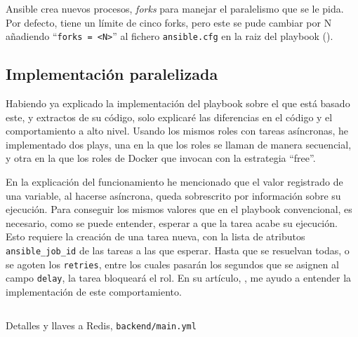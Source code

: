 \documentclass[11pt]{article}
\begin{document}
\begin{flushleft}
    Ansible crea nuevos procesos, \textit{forks} para manejar el paralelismo que se le pida. Por defecto, tiene un límite de cinco forks, pero este se pude cambiar por N añadiendo ``\texttt{forks = <N>}'' al fichero \texttt{ansible.cfg} en la raiz del playbook (\cite{ansible_forks}). 
    \linebreak
        

    \bigskip
    \bigskip
    \subsection{Implementación paralelizada}
    Habiendo ya explicado la implementación del playbook sobre el que está basado este, y extractos de su código, solo explicaré las diferencias en el código y el comportamiento a alto nivel. Usando los mismos roles con tareas asíncronas, he implementado dos plays, una en la que los roles se llaman de manera secuencial, y otra en la que los roles de Docker que invocan con la estrategia ``free''. 
    \linebreak

    \bigskip

        \begin{minipage}{.5\textwidth}
            En la explicación del funcionamiento he mencionado que el valor registrado de una variable, al hacerse asíncrona, queda sobrescrito por información sobre su ejecución. Para conseguir los mismos valores que en el playbook convencional, es necesario, como se puede entender, esperar a que la tarea acabe su ejecución. Esto requiere la creación de una tarea nueva, con la lista de atributos \texttt{ansible\_job\_id} de las tareas a las que esperar. Hasta que se resuelvan todas, o se agoten los \texttt{retries}, entre los cuales pasarán los segundos que se asignen al campo \texttt{delay}, la tarea bloqueará el rol. En su artículo, \cite{ansible_parallel_tasks}, me ayudo a entender la implementación de este comportamiento.
            \linebreak
            
        \end{minipage}%
        \hspace{1.6cm}
        \begin{minipage}{.35\textwidth}
            \inputminted[fontsize=\scriptsize, firstline=163, lastline=173, frame=single, linenos, breaklines]{yaml}{../../ansible/parallel_ansible/roles/infra-base/main.yml}
            \vspace{.5cm}
            \caption{Detalles y llaves a Redis, \texttt{backend/main.yml}}
        \end{minipage}
        \linebreak
    

\end{flushleft}
\end{document}
